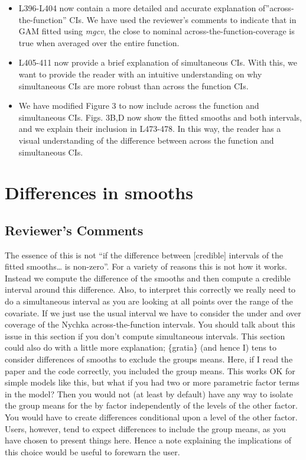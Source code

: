 \documentclass[
]{article}
\begin{document}
\begin{itemize}
\item
  L396-L404 now contain a more detailed and accurate explanation of''across-the-function'' CIs. We have used the reviewer's comments to indicate that in GAM fitted using \emph{mgcv}, the close to nominal across-the-function-coverage is true when averaged over the entire function.
\item
  L405-411 now provide a brief explanation of simultaneous CIs. With this, we want to provide the reader with an intuitive understanding on why simultaneous CIs are more robust than across the function CIs.
\item
  We have modified Figure 3 to now include across the function and simultaneous CIs. Figs. 3B,D now show the fitted smooths and both intervals, and we explain their inclusion in L473-478. In this way, the reader has a visual understanding of the difference between across the function and simultaneous CIs.
\end{itemize}

\hypertarget{differences-in-smooths}{%
\section{Differences in smooths}\label{differences-in-smooths}}

\hypertarget{reviewers-comments-8}{%
\subsection{Reviewer's Comments}\label{reviewers-comments-8}}

The essence of this is not ``if the difference between {[}credible{]} intervals of the fitted smooths\ldots{} is non-zero''. For a variety of reasons this is not how it works. Instead we compute the difference of the smooths and then compute a credible interval around this difference. Also, to interpret this correctly we really need to do a simultaneous interval as you are looking at all points over the range of the covariate. If we just use the usual interval we have to consider the under and over coverage of the Nychka across-the-function intervals. You should talk about this issue in this section if you don't compute simultaneous intervals.
This section could also do with a little more explanation; \{gratia\} (and hence I) tens to consider differences of smooths to exclude the groups means. Here, if I read the paper and the code correctly, you included the group means. This works OK for simple models like this, but what if you had two or more parametric factor terms in the model? Then you would not (at least by default) have any way to isolate the group means for the by factor independently of the levels of the other factor. You would have to create differences conditional upon a level of
the other factor. Users, however, tend to expect differences to include the group means, as you have chosen to present things here. Hence a note explaining the implications of this choice would be useful to forewarn the user.
\end{document}
